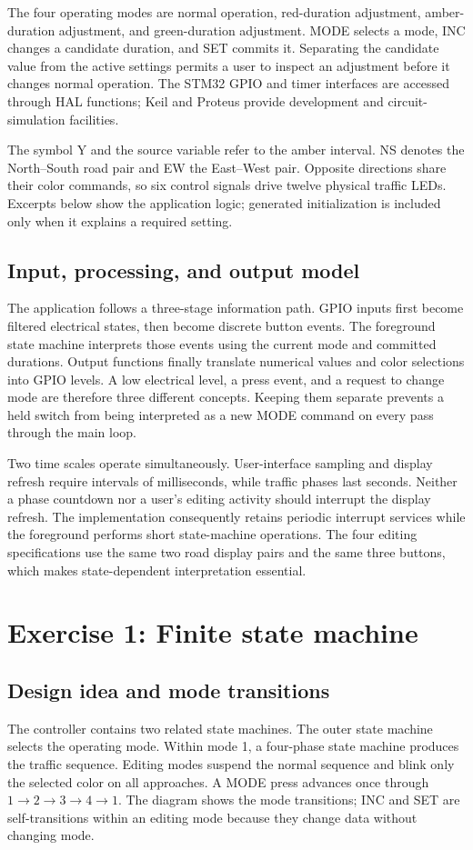 \documentclass[a4paper]{article}
\newcommand{\code}[1]{\texttt{\detokenize{#1}}}
\newcommand{\topic}[1]{\subsection{#1}}
\begin{document}
The four operating modes are normal operation, red-duration adjustment,
amber-duration adjustment, and green-duration adjustment. MODE selects a mode,
INC changes a candidate duration, and SET commits it. Separating the candidate
value from the active settings permits a user to inspect an adjustment before
it changes normal operation. The STM32 GPIO and timer interfaces are accessed
through HAL functions\cite{stm32,hal}; Keil and Proteus provide development and
circuit-simulation facilities\cite{keil,proteus}.

The symbol Y and the source variable \code{yellow_time} refer to the amber
interval. NS denotes the North--South road pair and EW the East--West pair.
Opposite directions share their color commands, so six control signals drive
twelve physical traffic LEDs. Excerpts below show the application logic;
generated initialization is included only when it explains a required setting.

\topic{Input, processing, and output model}

The application follows a three-stage information path. GPIO inputs first
become filtered electrical states, then become discrete button events. The
foreground state machine interprets those events using the current mode and
committed durations. Output functions finally translate numerical values and
color selections into GPIO levels. A low electrical level, a press event, and
a request to change mode are therefore three different concepts. Keeping them
separate prevents a held switch from being interpreted as a new MODE command
on every pass through the main loop.

Two time scales operate simultaneously. User-interface sampling and display
refresh require intervals of milliseconds, while traffic phases last seconds.
Neither a phase countdown nor a user's editing activity should interrupt the
display refresh. The implementation consequently retains periodic interrupt
services while the foreground performs short state-machine operations.
The four editing specifications use the same two road display pairs and the
same three buttons, which makes state-dependent interpretation essential.


\clearpage
\section{Exercise 1: Finite state machine}

\topic{Design idea and mode transitions}
The controller contains two related state machines. The outer state machine
selects the operating mode. Within mode 1, a four-phase state machine produces
the traffic sequence. Editing modes suspend the normal sequence and blink
only the selected color on all approaches. A MODE press advances once through
\(1\rightarrow2\rightarrow3\rightarrow4\rightarrow1\).
The diagram shows the mode transitions; INC and SET are self-transitions
within an editing mode because they change data without changing mode.
\end{document}
